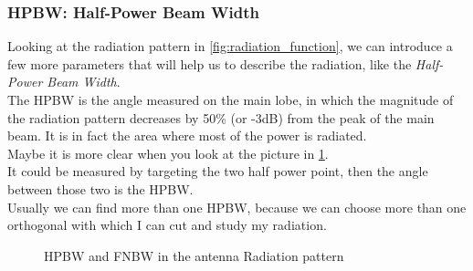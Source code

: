 \subsubsection*{HPBW: Half-Power Beam Width}
Looking at the radiation pattern in \cref{fig:radiation_function}, we can introduce a few more parameters that will help us to describe the radiation, like the \emph{Half-Power Beam Width}.\\
The HPBW is the angle measured on the main lobe, in which the magnitude of the radiation pattern decreases by 50\% (or -3dB) from the peak of the main beam. It is in fact the area where most of the power is radiated.\\
Maybe it is more clear when you look at the picture in \cref{fig:beam_width_2d}.\\
It could be measured by targeting the two half power point, then the angle between those two is the HPBW.\\
Usually we can find more than one HPBW, because we can choose more than one orthogonal with which I can cut and study my radiation.
\begin{figure}[H]
    \begin{center}
    \end{center} \caption{HPBW and FNBW in the antenna Radiation pattern}\label{fig:beam_width_2d} 
\end{figure}
